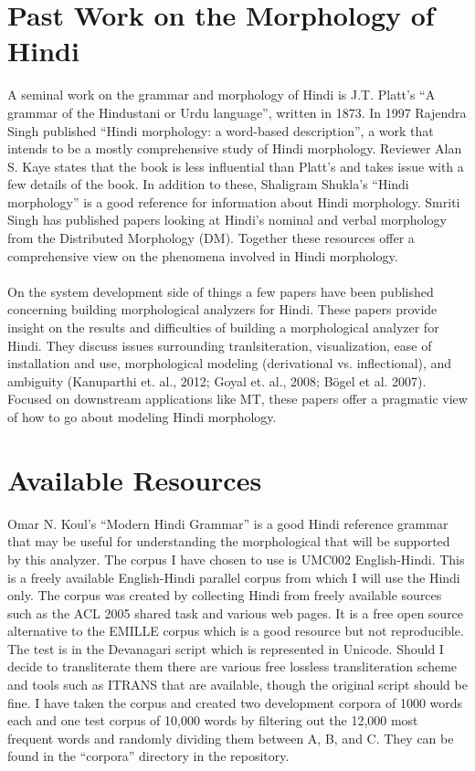 \documentclass[11pt,letterpaper]{article}
\begin{document}
\section{Past Work on the Morphology of Hindi}
A seminal work on the grammar and morphology of Hindi is J.T. Platt's ``A grammar of the Hindustani or Urdu language'', written in 1873. In 1997 Rajendra Singh published ``Hindi morphology: a word-based description'', a work that intends to be a mostly comprehensive study of Hindi morphology. Reviewer Alan S. Kaye states that the book is less influential than Platt's and takes issue with a few details of the book. In addition to these, Shaligram Shukla's ``Hindi morphology'' is a good reference for information about Hindi morphology. Smriti Singh has published papers looking at Hindi's nominal and verbal morphology from the Distributed Morphology (DM). Together these resources offer a comprehensive view on the phenomena involved in Hindi morphology.\\
\\
On the system development side of things a few papers have been published concerning building morphological analyzers for Hindi. These papers provide insight on the results and difficulties of building a morphological analyzer for Hindi. They discuss issues surrounding tranlsiteration, visualization, ease of installation and use, morphological modeling (derivational vs. inflectional), and ambiguity (Kanuparthi et. al., 2012; Goyal et. al., 2008; Bögel et al. 2007). Focused on downstream applications like MT, these papers offer a pragmatic view of how to go about modeling Hindi morphology. \\
\section{Available Resources}
Omar N. Koul's ``Modern Hindi Grammar'' is a good Hindi reference grammar that may be useful for understanding the morphological that will be supported by this analyzer.
The corpus I have chosen to use is UMC002 English-Hindi. This is a freely available English-Hindi parallel corpus from which I will use the Hindi only. The corpus was created by collecting Hindi from freely available sources such as the ACL 2005 shared task and various web pages. It is a free open source alternative to the EMILLE corpus which is a good resource but not reproducible. The test is in the Devanagari script which is represented in Unicode. Should I decide to transliterate them there are various free lossless transliteration scheme and tools such as ITRANS that are available, though the original script should be fine. I have taken the corpus and created two development corpora of 1000 words each and one test corpus of 10,000 words by filtering out the 12,000 most frequent words and randomly dividing them between A, B, and C. They can be found in the ``corpora'' directory in the repository.
\end{document}

